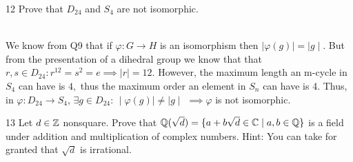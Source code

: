 \documentclass[12pt]{article}
\begin{document}
\bbni

\begin{problem}{12}
    Prove that $D_{24}$ and $S_4$ are not isomorphic.
\end{problem}

\begin{solution}
    \bbni \\ 
    We know from Q9 that if $\varphi: G \to H$ is an isomorphism then $\mid \varphi(g) \mid  =  \mid g \mid$. But from the presentation of a dihedral group we know that that $r, s \in D_{24}: r^{12} = s^2 = e \implies   \mid r \mid = 12$. However, the maximum length an m-cycle in $S_4$ can have is $4,$ thus the maximum order an element in $S_n$ can have is 4. 
    Thus, in $\varphi: D_{24} \to S_4$, $\exists g \in D_{24}: \, \mid \varphi(g) \mid  \neq  \mid g \mid$  $\implies \varphi$ is not isomorphic. 
\end{solution}

\newpage
\begin{problem}{13}
    Let $d \in \mathbb Z$ nonsquare. Prove that $\mathbb Q(\sqrt{d}) = \{ a + b\sqrt{d} \in \mathbb C \mid a, b \in \mathbb Q\}$ is a field under addition and multiplication of complex numbers. Hint: You can take for granted that $\sqrt{d}$ is irrational.
\end{problem}
\end{document}
